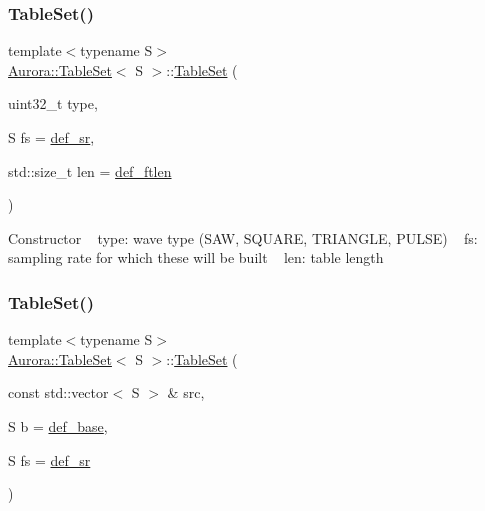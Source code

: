 \subsubsection{\texorpdfstring{Table\+Set()}{TableSet()}\hspace{0.1cm}{\footnotesize\ttfamily [1/2]}}
{\footnotesize\ttfamily template$<$typename S$>$ \\
\hyperlink{class_aurora_1_1_table_set}{Aurora\+::\+Table\+Set}$<$ S $>$\+::\hyperlink{class_aurora_1_1_table_set}{Table\+Set} (\begin{DoxyParamCaption}\item[{uint32\+\_\+t}]{type,  }\item[{S}]{fs = {\ttfamily \hyperlink{namespace_aurora_ad49263d809bea98dd422e95bc91bc03e}{def\+\_\+sr}},  }\item[{std\+::size\+\_\+t}]{len = {\ttfamily \hyperlink{namespace_aurora_a14dabfd9feedfa09c0e6f86d2627f006}{def\+\_\+ftlen}} }\end{DoxyParamCaption})\hspace{0.3cm}{\ttfamily [inline]}}

Constructor ~\newline
type\+: wave type (S\+AW, S\+Q\+U\+A\+RE, T\+R\+I\+A\+N\+G\+LE, P\+U\+L\+SE) ~\newline
fs\+: sampling rate for which these will be built ~\newline
len\+: table length \mbox{\label{class_aurora_1_1_table_set_a884ecfde480fdac4c32fa10a82286941}} 
\subsubsection{\texorpdfstring{Table\+Set()}{TableSet()}\hspace{0.1cm}{\footnotesize\ttfamily [2/2]}}
{\footnotesize\ttfamily template$<$typename S$>$ \\
\hyperlink{class_aurora_1_1_table_set}{Aurora\+::\+Table\+Set}$<$ S $>$\+::\hyperlink{class_aurora_1_1_table_set}{Table\+Set} (\begin{DoxyParamCaption}\item[{const std\+::vector$<$ S $>$ \&}]{src,  }\item[{S}]{b = {\ttfamily \hyperlink{namespace_aurora_acb267dff62f74484893c2d5b679b78bf}{def\+\_\+base}},  }\item[{S}]{fs = {\ttfamily \hyperlink{namespace_aurora_ad49263d809bea98dd422e95bc91bc03e}{def\+\_\+sr}} }\end{DoxyParamCaption})\hspace{0.3cm}{\ttfamily [inline]}}

